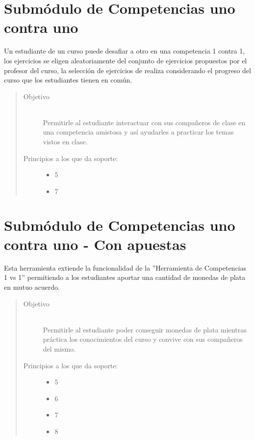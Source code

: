 \section{Submódulo de Competencias uno contra uno}

    Un estudiante de un curso puede desafiar a otro en una competencia 1 contra 1, los ejercicios se eligen aleatoriamente del conjunto de ejercicios propuestos por el profesor del curso, la selección de ejercicios de realiza considerando el progreso del curso que los estudiantes tienen en común.

    \begin{quote}
    \begin{description}
    \item[Objetivo] \hfill\\
        Permitirle al estudiante interactuar con sus compañeros de clase en una competencia amistosa y así ayudarles a practicar los temas vistos en clase.

    \item[Principios a los que da soporte:] \hfill
        \begin{itemize}
            \item 5 \principioV
            \item 7 \principioVII
        \end{itemize}
    \end{description}
    \end{quote}

\section{Submódulo de Competencias uno contra uno - Con apuestas}

    Esta herramienta extiende la funcionalidad de la ''Herramienta de Competencias 1 vs 1'' permitiendo a los estudiantes aportar una cantidad de monedas de plata en mutuo acuerdo.

    \begin{quote}
    \begin{description}
    \item[Objetivo] \hfill\\
        Permitirle al estudiante poder conseguir monedas de plata mientras práctica los conocimientos del curso y convive con sus compañeros del mismo.

    \item[Principios a los que da soporte:] \hfill
        \begin{itemize}
            \item 5 \principioV
            \item 6 \principioVI
            \item 7 \principioVII
            \item 8 \principioVIII
        \end{itemize}
    \end{description}
    \end{quote}

